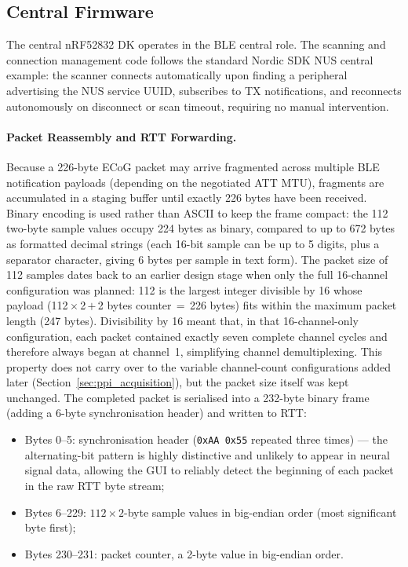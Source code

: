 
\subsection{Central Firmware}\label{sec:central_firmware}

The central nRF52832 DK operates in the BLE central role. The scanning and
connection management code follows the standard Nordic SDK NUS central example:
the scanner connects automatically upon finding a peripheral advertising the
NUS service UUID, subscribes to TX notifications, and reconnects autonomously
on disconnect or scan timeout, requiring no manual intervention.

\paragraph{Packet Reassembly and RTT Forwarding.}
Because a 226-byte ECoG packet may arrive fragmented across multiple BLE
notification payloads (depending on the negotiated ATT MTU), fragments are
accumulated in a staging buffer until exactly 226 bytes have been received.
Binary encoding is used rather than ASCII to keep the frame compact: the 112
two-byte sample values occupy 224 bytes as binary, compared to up to 672 bytes
as formatted decimal strings (each 16-bit sample can be up to 5 digits, plus a
separator character, giving 6 bytes per sample in text form). The packet size of
112 samples dates back to an earlier design stage when only the full 16-channel
configuration was planned: 112 is the largest integer divisible by 16 whose
payload (112\,$\times$\,2\,$+$\,2 bytes counter\,$=$\,226 bytes) fits within the
maximum packet length (247 bytes). Divisibility by 16 meant that, in that
16-channel-only configuration, each packet contained exactly seven complete
channel cycles and therefore always began at channel~1, simplifying channel
demultiplexing. This property does not carry over to the variable channel-count
configurations added later (Section~\ref{sec:ppi_acquisition}), but the packet
size itself was kept unchanged. The completed packet is serialised
into a 232-byte binary frame (adding a 6-byte synchronisation header) and written
to RTT:

\begin{itemize}
    \item Bytes 0--5: synchronisation header (\texttt{0xAA 0x55} repeated
    three times) --- the alternating-bit pattern is highly distinctive and
    unlikely to appear in neural signal data, allowing the GUI to reliably
    detect the beginning of each packet in the raw RTT byte stream;
    \item Bytes 6--229: $112 \times 2$-byte sample values in big-endian order
    (most significant byte first);
    \item Bytes 230--231: packet counter, a 2-byte value in big-endian order.
\end{itemize}

